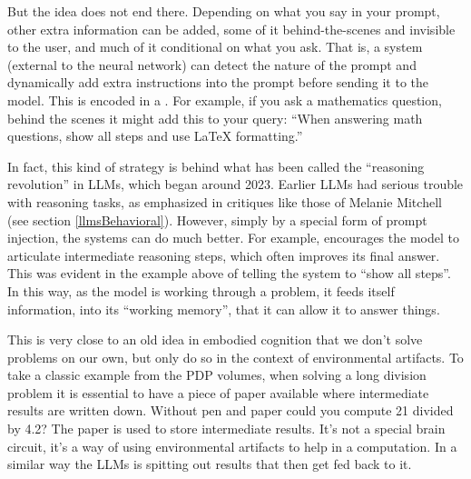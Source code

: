 But the idea does not end there. Depending on what you say in your prompt,
other extra information can be added, some of it behind-the-scenes and
invisible to the user, and much of it conditional on what you ask. That is, a
system (external to the neural network) can detect the nature of the prompt and
dynamically add extra instructions into the prompt before sending it to the
model. This is encoded in a . For example, if you
ask a mathematics question, behind the scenes it might add this to your query:
``When answering math questions, show all steps and use LaTeX formatting.''

In fact, this kind of strategy is behind what has been called the ``reasoning
revolution'' in LLMs, which began around 2023. Earlier LLMs had serious trouble
with reasoning tasks, as emphasized in critiques like those of Melanie Mitchell
(see section \ref{llmsBehavioral}). However, simply by a special form of prompt
injection, the systems can do much better.  For example,  encourages the model to articulate intermediate reasoning steps, which
often improves its final answer. This was evident in the example above of
telling the system to ``show all steps''. In this way, as the model is working
through a problem, it feeds itself information, into its ``working memory'',
that it can allow it to answer things.

This is very close to an old idea in embodied cognition that we don't solve
problems on our own, but only do so in the context of environmental artifacts.
To take a classic example from the PDP volumes, when solving a long division
problem it is essential to have a piece of paper available where intermediate
results are written down. Without pen and paper could you compute 21 divided
by 4.2? The paper is used to store intermediate results. It's not a special
brain circuit, it's a way of using environmental artifacts to help in a
computation. In a similar way the LLMs is spitting out results that then get
fed back to it.

